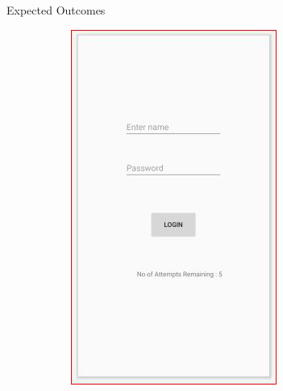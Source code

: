 \documentclass{beamer}
\begin{document}
\begin{frame}[allowframebreaks]{Expected Outcomes}
\begin{figure}
\begin{subfigure}[b]{0.3\linewidth}
			{\includegraphics[width=\linewidth]{App_Result_1}}
			\label{App}
	\end{subfigure}
	\begin{subfigure}[b]{0.3\linewidth}

\end{subfigure}
\end{figure}
\end{frame}
\end{document}
